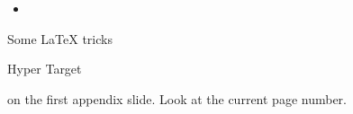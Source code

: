 \documentclass[11pt, a4paper, landscape]{article}
\begin{document}
\NewPage{}
\vfill
\begin{itemize}
\item 
\end{itemize}
\vfill
















\NewPage{}
\vfill
Some \LaTeX\xspace tricks
\vfill




\FinalPage



\NewPage



\appendix
\NewPage{}
\vfill
\hypertarget{anchorname}{Hyper Target} on the first appendix slide. 
Look at the current page number.
\vfill
\end{document}
